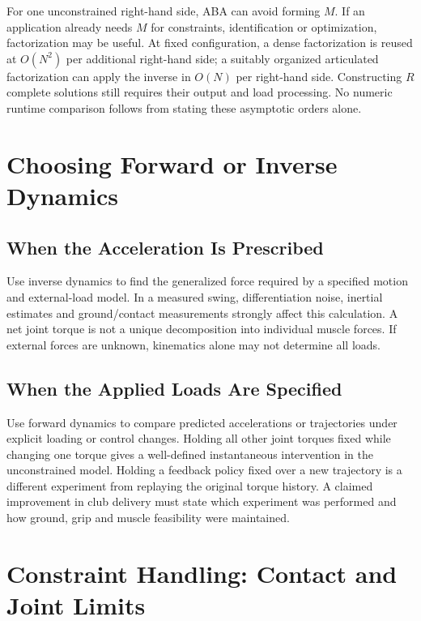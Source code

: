 For one unconstrained right-hand side, ABA can avoid forming $M$. If an application already needs $M$ for constraints, identification or optimization, factorization may be useful. At fixed configuration, a dense factorization is reused at $O(N^2)$ per additional right-hand side; a suitably organized articulated factorization can apply the inverse in $O(N)$ per right-hand side. Constructing $R$ complete solutions still requires their output and load processing. No numeric runtime comparison follows from stating these asymptotic orders alone.

\section{Choosing Forward or Inverse Dynamics}
\label{sec:fd_id_decision}

\subsection{When the Acceleration Is Prescribed}
\label{subsec:use_id}

Use inverse dynamics to find the generalized force required by a specified motion and external-load model. In a measured swing, differentiation noise, inertial estimates and ground/contact measurements strongly affect this calculation. A net joint torque is not a unique decomposition into individual muscle forces. If external forces are unknown, kinematics alone may not determine all loads.

\subsection{When the Applied Loads Are Specified}
\label{subsec:use_fd}

Use forward dynamics to compare predicted accelerations or trajectories under explicit loading or control changes. Holding all other joint torques fixed while changing one torque gives a well-defined instantaneous intervention in the unconstrained model. Holding a feedback policy fixed over a new trajectory is a different experiment from replaying the original torque history. A claimed improvement in club delivery must state which experiment was performed and how ground, grip and muscle feasibility were maintained.

\section{Constraint Handling: Contact and Joint Limits}
\label{sec:constraints}

